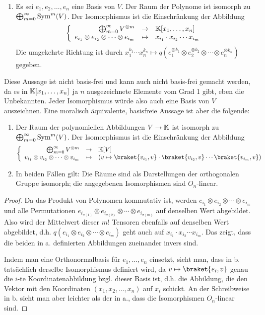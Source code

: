 \begin{theorem}
\begin{enumerate}
\item Es sei $e_1, e_2, \ldots, e_n$ eine Basis von $V$. Der Raum der Polynome ist isomorph zu $\bigoplus_{m=0}^\infty \operatorname{Sym}^m(V)$. Der Isomorphismus ist die Einschränkung der Abbildung
\[\left\lbrace\begin{array}{rcl}
\bigoplus_{m=0}^\infty V^{\otimes m} &\to& \mathbb{K}[x_1,\ldots,x_n] \\
e_{i_1} \otimes e_{i_2} \otimes \cdots \otimes e_{i_m} &\mapsto& x_{i_1}\cdot x_{i_2} \cdots x_{i_m}
\end{array}\right.\]
Die umgekehrte Richtung ist durch $x_1^{k_1} \cdots x_n^{k_n} \mapsto q(e_1^{\otimes k_1} \otimes e_2^{\otimes k_2} \otimes \cdots \otimes e_n^{\otimes k_n})$ gegeben.
\end{enumerate}
\smallbreak
Diese Aussage ist nicht basis-frei und kann auch nicht basis-frei gemacht werden, da es in $\mathbb{K}[x_1, \ldots, x_n]$ ja $n$ ausgezeichnete Elemente vom Grad 1 gibt, eben die Unbekannten. Jeder Isomorphismus würde also auch eine Basis von $V$ auszeichnen.
\smallbreak
Eine moralisch äquivalente, basisfreie Aussage ist aber die folgende:
\begin{enumerate}[resume]
\item Der Raum der polynomiellen Abbildungen $V\to\mathbb{K}$ ist isomorph zu $\bigoplus_{m=0}^\infty \operatorname{Sym}^m(V)$. Der Isomorphismus ist die Einschränkung der Abbildung
\[\left\lbrace\begin{array}{rcl}
\bigoplus_{m=0}^\infty V^{\otimes m} &\to& \IK[V] \\
v_{i_1} \otimes v_{i_2} \otimes \cdots \otimes v_{i_m} &\mapsto& (v\mapsto \braket{v_{i_1},v} \cdot \braket{v_{i_2},v} \cdots \braket{v_{i_m},v})
\end{array}\right. \]
\item In beiden Fällen gilt: Die Räume sind als Darstellungen der orthogonalen Gruppe isomorph; die angegebenen Isomorphismen sind $O_n$-linear.
\end{enumerate}
\end{theorem}
\begin{proof}
Da das Produkt von Polynomen kommutativ ist, werden $e_{i_1} \otimes e_{i_2} \otimes \cdots \otimes e_{i_m}$ und alle Permutationen $e_{i_{\sigma(1)}} \otimes e_{i_{\sigma(2)}} \otimes \cdots \otimes e_{i_{\sigma(m)}}$ auf denselben Wert abgebildet. Also wird der Mittelwert dieser $m!$ Tensoren ebenfalls auf denselben Wert abgebildet, d.h. $q(e_{i_1} \otimes e_{i_2} \otimes \cdots \otimes e_{i_m})$ geht auch auf $x_{i_1}\cdot x_{i_2} \cdots x_{i_m}$. Das zeigt, dass die beiden in a. definierten Abbildungen zueinander invers sind.

Indem man eine Orthonormalbasis für $e_1, \ldots, e_n$ einsetzt, sieht man, dass in b. tatsächlich derselbe Isomorphismus definiert wird, da $v\mapsto \braket{e_i, v}$ genau die $i$-te Koordinatenabbildung bzgl. dieser Basis ist, d.h. die Abbildung, die den Vektor mit den Koordinaten $(x_1, x_2, \ldots, x_n)$ auf $x_i$ schickt. An der Schreibweise in b. sieht man aber leichter als der in a., dass die Isomorphismen $O_n$-linear sind. 
\end{proof}
